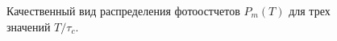\begin{figure}
\centering



\caption{Качественный вид распределения фотоостчетов
  $P_m\left(T\right)$ для трех значений $T/\tau_c$.}
\label{figPart4Ch2_6}
\end{figure}

